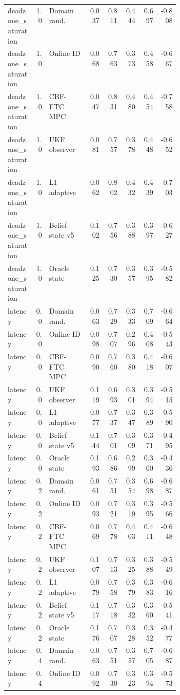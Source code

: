 \documentclass{article}
\begin{document}
\begin{center}
\begin{longtable}{p{0.16\linewidth}rp{0.23\linewidth}rrrrr}
deadzone\_saturation & 1.0 & Domain rand. & 0.037 & 0.811 & 0.444 & 0.697 & -0.808\\
deadzone\_saturation & 1.0 & Online ID & 0.068 & 0.763 & 0.373 & 0.458 & -0.667\\
deadzone\_saturation & 1.0 & CBF-FTC MPC & 0.047 & 0.831 & 0.480 & 0.454 & -0.758\\
deadzone\_saturation & 1.0 & UKF observer & 0.081 & 0.757 & 0.378 & 0.448 & -0.652\\
deadzone\_saturation & 1.0 & L1 adaptive & 0.062 & 0.802 & 0.432 & 0.439 & -0.703\\
deadzone\_saturation & 1.0 & Belief state v5 & 0.102 & 0.756 & 0.388 & 0.397 & -0.627\\
deadzone\_saturation & 1.0 & Oracle state & 0.125 & 0.730 & 0.357 & 0.395 & -0.582\\
latency & 0.0 & Domain rand. & 0.063 & 0.729 & 0.333 & 0.709 & -0.664\\
latency & 0.0 & Online ID & 0.098 & 0.707 & 0.296 & 0.408 & -0.543\\
latency & 0.0 & CBF-FTC MPC & 0.090 & 0.760 & 0.380 & 0.418 & -0.607\\
latency & 0.0 & UKF observer & 0.119 & 0.693 & 0.301 & 0.394 & -0.515\\
latency & 0.0 & L1 adaptive & 0.077 & 0.737 & 0.347 & 0.389 & -0.590\\
latency & 0.0 & Belief state v5 & 0.144 & 0.701 & 0.309 & 0.371 & -0.495\\
latency & 0.0 & Oracle state & 0.193 & 0.686 & 0.299 & 0.360 & -0.436\\
latency & 0.2 & Domain rand. & 0.061 & 0.751 & 0.354 & 0.698 & -0.687\\
latency & 0.2 & Online ID & 0.093 & 0.721 & 0.319 & 0.395 & -0.566\\
latency & 0.2 & CBF-FTC MPC & 0.069 & 0.778 & 0.403 & 0.411 & -0.648\\
latency & 0.2 & UKF observer & 0.107 & 0.713 & 0.325 & 0.388 & -0.549\\
latency & 0.2 & L1 adaptive & 0.079 & 0.758 & 0.379 & 0.383 & -0.616\\
latency & 0.2 & Belief state v5 & 0.117 & 0.718 & 0.332 & 0.360 & -0.541\\
latency & 0.2 & Oracle state & 0.176 & 0.707 & 0.328 & 0.352 & -0.477\\
latency & 0.4 & Domain rand. & 0.063 & 0.751 & 0.357 & 0.705 & -0.687\\
latency & 0.4 & Online ID & 0.092 & 0.730 & 0.323 & 0.394 & -0.573\\

\end{longtable}
\end{center}
\end{document}
